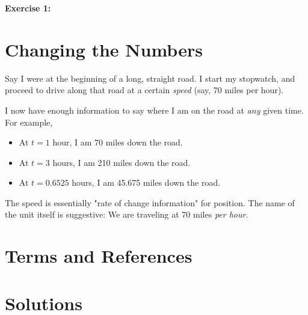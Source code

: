 \documentclass{article}
\begin{document}

\textbf{Exercise 1:} 



\section{Changing the Numbers}









Say I were at the beginning of a long, straight road. I start my stopwatch, and proceed to drive along that road at a certain \emph{speed} (say, 70 miles per hour). 

I now have enough information to say where I am on the road at \emph{any} given time. For example, 

\begin{itemize}
\item At $t = 1$ hour, I am 70 miles down the road.
\item At $t = 3$ hours, I am 210 miles down the road.
\item At $t = 0.6525$ hours, I am 45.675 miles down the road.
\end{itemize}

The speed is essentially "rate of change information" for position. The name of the unit itself is suggestive: We are traveling at 70 miles \emph{per hour}.






\section{Terms and References}

\section{Solutions}
\end{document}
